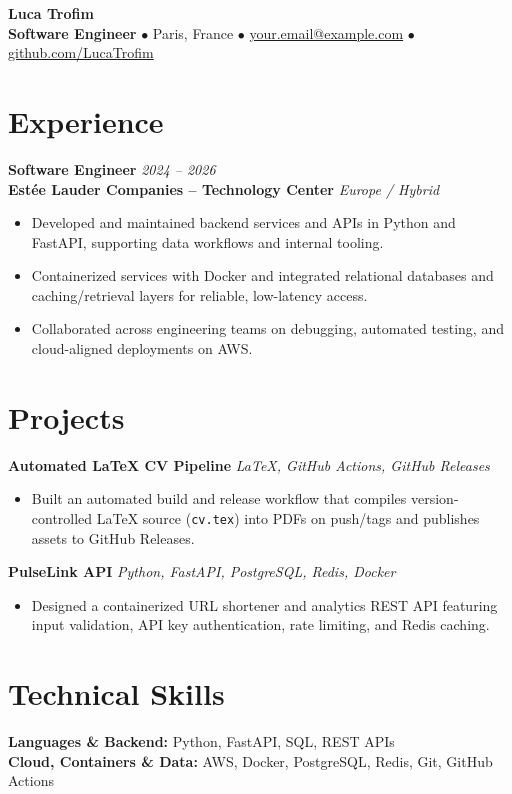 \documentclass[a4paper,10pt]{article}
\newcommand{\role}[4]{%
  \textbf{#1} \hfill \textit{#2}\\
  \textbf{#3} \hfill \textit{#4}\\[2pt]
}
\begin{document}
{\LARGE \textbf{Luca Trofim}}\\[2pt]
\textbf{Software Engineer} \quad $\bullet$ \quad Paris, France \quad $\bullet$ \quad
\href{mailto:trofimlucamarian@gmail.com}{your.email@example.com} \quad $\bullet$ \quad
\href{https://github.com/LucaTrofim}{github.com/LucaTrofim}

\section{Experience}
\role{Software Engineer}{2024 -- 2026}{Est\'ee Lauder Companies -- Technology Center}{Europe / Hybrid}
\begin{itemize}
  \item Developed and maintained backend services and APIs in Python and FastAPI, supporting data workflows and internal tooling.
  \item Containerized services with Docker and integrated relational databases and caching/retrieval layers for reliable, low-latency access.
  \item Collaborated across engineering teams on debugging, automated testing, and cloud-aligned deployments on AWS.
\end{itemize}

\section{Projects}
\textbf{Automated LaTeX CV Pipeline} \hfill \textit{LaTeX, GitHub Actions, GitHub Releases}\\
\begin{itemize}
  \item Built an automated build and release workflow that compiles version-controlled LaTeX source (\texttt{cv.tex}) into PDFs on push/tags and publishes assets to GitHub Releases.
\end{itemize}

\textbf{PulseLink API} \hfill \textit{Python, FastAPI, PostgreSQL, Redis, Docker}\\
\begin{itemize}
  \item Designed a containerized URL shortener and analytics REST API featuring input validation, API key authentication, rate limiting, and Redis caching.
\end{itemize}

\section{Technical Skills}
\textbf{Languages \& Backend:} Python, FastAPI, SQL, REST APIs\\
\textbf{Cloud, Containers \& Data:} AWS, Docker, PostgreSQL, Redis, Git, GitHub Actions
\end{document}
